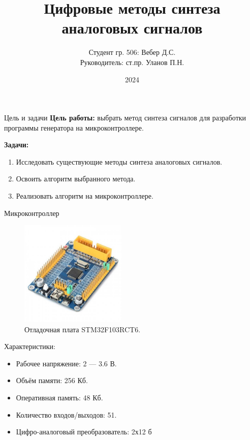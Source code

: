 \documentclass[10pt]{beamer}
\begin{document}
\title{Цифровые методы синтеза аналоговых сигналов}
\author{Студент гр. 506: Вебер Д.С.\\Руководитель:  ст.пр. Уланов П.Н.}
\date{2024}


\frame{\titlepage}

\begin{frame}{Цель и задачи}
  \textbf{Цель работы:} выбрать метод синтеза сигналов для разработки программы генератора на микроконтроллере.

  \textbf{Задачи:} 
  \begin{enumerate}
		\item Исследовать существующие методы синтеза аналоговых сигналов.
		\item Освоить алгоритм выбранного метода.
		\item Реализовать алгоритм на микроконтроллере.
  \end{enumerate}
\end{frame}

\begin{frame}{Микроконтроллер}
  \begin{figure}
  \includegraphics[width=0.45\textwidth]{stmka}
  \caption{Отладочная плата STM32F103RCT6.}
  \end{figure}
  Характеристики:
  \begin{itemize}
 	 \item Рабочее напряжение: 2 --- 3.6 В.
 	 \item Объём памяти: 256 Кб.
  	 \item Оперативная память: 48 Кб.
 	 \item Количество входов/выходов: 51.
 	 \item Цифро-аналоговый преобразователь: 2х12 б
  \end{itemize}
\end{frame}
\end{document}
